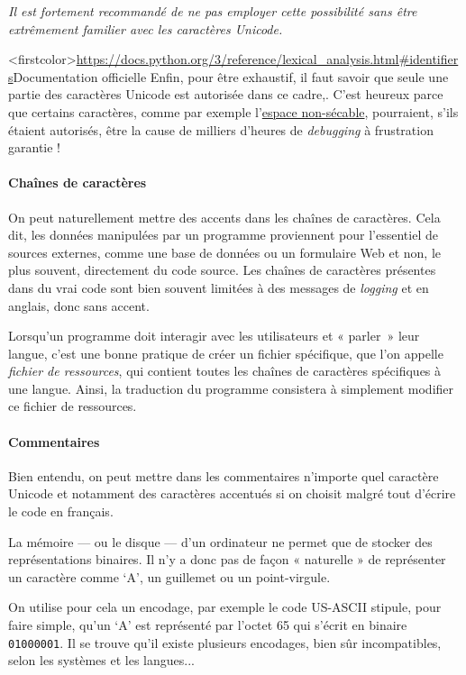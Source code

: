 \emph{Il est fortement recommandé de ne pas employer cette possibilité sans être extrêmement familier avec les caractères Unicode.}

\caution[t]<firstcolor>{\url{https://docs.python.org/3/reference/lexical\_analysis.html\#identifiers}}{Documentation officielle}
Enfin, pour être exhaustif, il faut savoir que seule une partie des caractères Unicode est autorisée dans ce cadre,. C'est heureux parce que certains caractères, comme par exemple l'\href{http://www.fileformat.info/info/unicode/char/a0/index.htm}{espace non-sécable}, pourraient, s'ils étaient autorisés, être la cause de milliers d'heures de \textit{debugging} à frustration garantie !

\paragraph{Chaînes de caractères} On peut naturellement mettre des accents dans les chaînes de caractères. Cela dit, les données manipulées par un programme proviennent pour l'essentiel de sources externes, comme une base de données ou un formulaire Web et non, le plus souvent, directement du code source. Les chaînes de caractères présentes dans du vrai code sont bien souvent limitées à des messages de \textit{logging} et en anglais, donc sans accent.

Lorsqu'un programme doit interagir avec les utilisateurs et « parler~» leur langue, c'est une bonne pratique de créer un fichier spécifique, que l'on appelle \emph{fichier de ressources}, qui contient toutes les chaînes de caractères spécifiques à une langue. Ainsi, la traduction du programme consistera à simplement modifier ce fichier de ressources.

\paragraph{Commentaires} Bien entendu, on peut mettre dans les commentaires n'importe quel caractère Unicode et notamment des caractères accentués si on choisit malgré tout d'écrire le code en français.


La mémoire --- ou le disque --- d'un ordinateur ne permet que de stocker des représentations binaires. Il n'y a donc pas de façon « naturelle » de représenter un caractère comme `A', un guillemet ou un point-virgule.

On utilise pour cela un encodage, par exemple le code US-ASCII stipule, pour faire simple, qu'un `A' est représenté par l'octet 65 qui s'écrit en binaire \texttt{01000001}. Il se trouve qu'il existe plusieurs encodages, bien sûr incompatibles, selon les systèmes et les langues...

